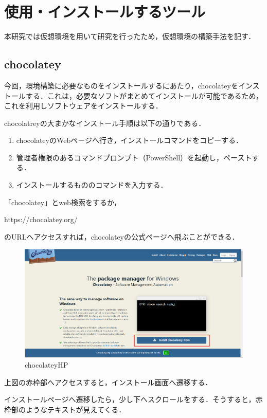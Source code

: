 \section{使用・インストールするツール}
本研究では仮想環境を用いて研究を行ったため，仮想環境の構築手法を記す．
\subsection{chocolatey}
今回，環境構築に必要なものをインストールするにあたり，chocolateyをインストールする．これは，必要なソフトがまとめてインストールが可能であるため，これを利用しソフトウェアをインストールする．

chocolatreyの大まかなインストール手順は以下の通りである．
\begin{enumerate}
 \item chocolateyのWebページへ行き，インストールコマンドをコピーする．
 \item 管理者権限のあるコマンドプロンプト（PowerShell）を起動し，ペーストする．
 \item インストールするもののコマンドを入力する．
\end{enumerate}

「chocolatey」とweb検索をするか，

https://chocolatey.org/

のURLへアクセスすれば，chocolateyの公式ページへ飛ぶことができる．

\begin{figure}[htb]
\centering
\includegraphics[width=13cm]{4-1.png}
\caption{chocolateyHP}\label{4-1}
\end{figure}
上図の赤枠部へアクセスすると，インストール画面へ遷移する．
\newpage

インストールページへ遷移したら，少し下へスクロールをする．そうすると，赤枠部のようなテキストが見えてくる．

